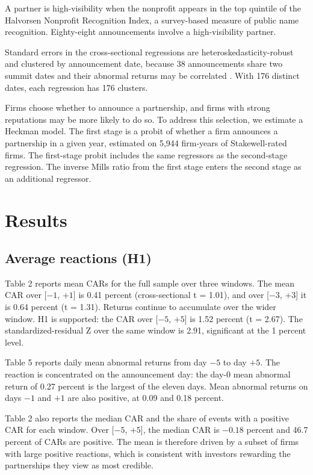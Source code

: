 \documentclass[11pt]{article}
\newcommand{\win}[2]{[$#1$, $#2$]}
\begin{document}
A partner is high-visibility when the nonprofit appears in the top quintile of the Halvorsen Nonprofit Recognition Index, a survey-based measure of public name recognition. Eighty-eight announcements involve a high-visibility partner.

Standard errors in the cross-sectional regressions are heteroskedasticity-robust and clustered by announcement date, because 38 announcements share two summit dates and their abnormal returns may be correlated \citep{petersen2009}. With 176 distinct dates, each regression has 176 clusters.

Firms choose whether to announce a partnership, and firms with strong reputations may be more likely to do so. To address this selection, we estimate a Heckman model. The first stage is a probit of whether a firm announces a partnership in a given year, estimated on 5,944 firm-years of Stakewell-rated firms. The first-stage probit includes the same regressors as the second-stage regression. The inverse Mills ratio from the first stage enters the second stage as an additional regressor.

\section{Results}

\subsection{Average reactions (H1)}

Table 2 reports mean CARs for the full sample over three windows. The mean CAR over \win{-1}{+1} is 0.41 percent (cross-sectional t = 1.01), and over \win{-3}{+3} it is 0.64 percent (t = 1.31). Returns continue to accumulate over the wider window. H1 is supported: the CAR over [$-5$, $+5$] is 1.52 percent (t = 2.67). The standardized-residual Z over the same window is 2.91, significant at the 1 percent level.

Table 5 reports daily mean abnormal returns from day $-5$ to day $+5$. The reaction is concentrated on the announcement day: the day-0 mean abnormal return of 0.27 percent is the largest of the eleven days. Mean abnormal returns on days $-1$ and $+1$ are also positive, at 0.09 and 0.18 percent.

Table 2 also reports the median CAR and the share of events with a positive CAR for each window. Over \win{-5}{+5}, the median CAR is $-0.18$ percent and 46.7 percent of CARs are positive. The mean is therefore driven by a subset of firms with large positive reactions, which is consistent with investors rewarding the partnerships they view as most credible.
\end{document}
